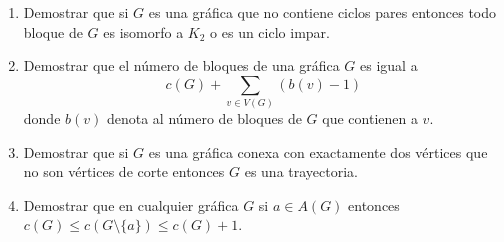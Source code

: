 \documentclass[12pt]{report}
\numberwithin{section}{chapter}
\begin{document}
\begin{enumerate}
\item Demostrar que si $G$ es una gráfica que no contiene ciclos pares entonces todo bloque de $G$ es isomorfo a $K_2$ o es un ciclo impar.

\item Demostrar que el número de bloques de una gráfica $G$ es igual a
$$c(G)+ \sum_{v\in V(G)}(b(v)-1)$$
donde $b(v)$ denota al número de bloques de $G$ que contienen a $v$.

\item Demostrar que si $G$ es una gráfica conexa con exactamente dos vértices que no son vértices de corte entonces $G$ es una trayectoria.

\item Demostrar que en cualquier gráfica $G$ si $a\in A(G)$ entonces $c(G) \leq c(G \setminus \{a\}) \leq c(G)+1$.



\end{enumerate}
\end{document}

